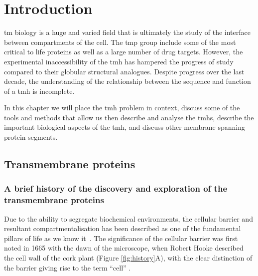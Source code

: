 \chapter{Introduction}
\sloppy
\gls{tm} biology is a huge and varied field that is ultimately the study of the interface between compartments of the cell.
The \gls{tmp} group include some of the most critical to life proteins as well as a large number of drug targets.
However, the experimental inaccessibility of the \gls{tmh} has hampered the progress of study compared to their globular structural analogues.
Despite progress over the last decade, the understanding of the relationship between the sequence and function of a \gls{tmh} is incomplete.

In this chapter we will place the \gls{tmh} problem in context, discuss some of the tools and methods that allow us then describe and analyse the \gls{tmh}s, describe the important biological aspects of the \gls{tmh}, and discuss other membrane spanning protein segments.

\section{Transmembrane proteins}

\subsection{A brief history of the discovery and exploration of the transmembrane proteins}

Due to the ability to segregate biochemical environments, the cellular barrier and resultant compartmentalisation has been described as one of the fundamental pillars of life as we know it~\cite{Ladokhin2015, Koshland2002}.
The significance of the cellular barrier was first noted in 1665 with the dawn of the microscope, when Robert Hooke described the cell wall of the cork plant (Figure \ref{fig:history}A), with the clear distinction of the barrier giving rise to the term ``cell'' \cite{Donaldson2010, hooke1961micrographia}.


